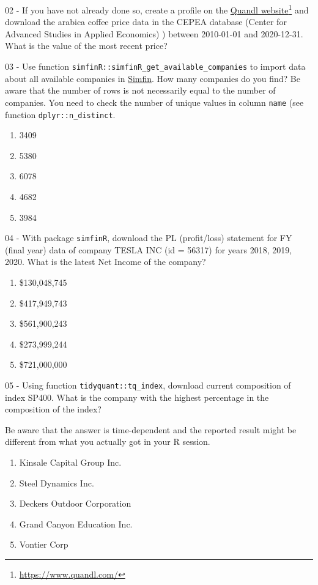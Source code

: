 \documentclass[
  12pt,
]{book}
\providecommand{\tightlist}{%
  \setlength{\itemsep}{0pt}\setlength{\parskip}{0pt}}
\begin{document}
02 -
If you have not already done so, create a profile on the \href{https://www.quandl.com/}{Quandl website}\footnote{\url{https://www.quandl.com/}} and download the arabica coffee price data in the CEPEA database (Center for Advanced Studies in Applied Economics) ) between 2010-01-01 and 2020-12-31. What is the value of the most recent price?

03 -
Use function \texttt{simfinR::simfinR\_get\_available\_companies} to import data about all available companies in \href{https://simfin.com}{Simfin}. How many companies do you find? Be aware that the number of rows is not necessarily equal to the number of companies. You need to check the number of unique values in column \texttt{name} (see function \texttt{dplyr::n\_distinct}.

\begin{enumerate}
\def\labelenumi{\alph{enumi})}
\tightlist
\item
  3409
\item
  5380
\item
  6078
\item
  4682
\item
  3984
\end{enumerate}

04 -
With package \texttt{simfinR}, download the PL (profit/loss) statement for FY (final year) data of company TESLA INC (id = 56317) for years 2018, 2019, 2020. What is the latest Net Income of the company?

\begin{enumerate}
\def\labelenumi{\alph{enumi})}
\tightlist
\item
  \$130,048,745
\item
  \$417,949,743
\item
  \$561,900,243
\item
  \$273,999,244
\item
  \$721,000,000
\end{enumerate}

05 -
Using function \texttt{tidyquant::tq\_index}, download current composition of index SP400. What is the company with the highest percentage in the composition of the index?

Be aware that the answer is time-dependent and the reported result might be different from what you actually got in your R session.

\begin{enumerate}
\def\labelenumi{\alph{enumi})}
\tightlist
\item
  Kinsale Capital Group Inc.
\item
  Steel Dynamics Inc.
\item
  Deckers Outdoor Corporation
\item
  Grand Canyon Education Inc.
\item
  Vontier Corp
\end{enumerate}
\end{document}
